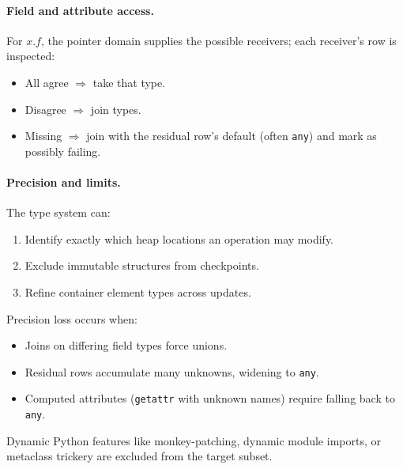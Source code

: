 \paragraph{Field and attribute access.}
For $x.f$, the pointer domain supplies the possible receivers; each receiver’s row is inspected:
\begin{itemize}
\item All agree $\Rightarrow$ take that type.
\item Disagree $\Rightarrow$ join types.
\item Missing $\Rightarrow$ join with the residual row’s default (often \texttt{any}) and mark as possibly failing.
\end{itemize}

\paragraph{Precision and limits.}
The type system can:
\begin{enumerate}
\item Identify exactly which heap locations an operation may modify.
\item Exclude immutable structures from checkpoints.
\item Refine container element types across updates.
\end{enumerate}
Precision loss occurs when:
\begin{itemize}
\item Joins on differing field types force unions.
\item Residual rows accumulate many unknowns, widening to \texttt{any}.
\item Computed attributes (\texttt{getattr} with unknown names) require falling back to \texttt{any}.
\end{itemize}
Dynamic Python features like monkey-patching, dynamic module imports, or metaclass trickery are excluded from the target subset.

